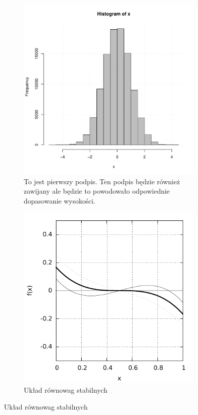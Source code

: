 \documentclass[polish, twoside, 12pt, a4paper]{article}
\theoremstyle{definition}
\theoremstyle{plain}
\theoremstyle{remark}
\begin{document}
\begin{figure}[hbt]
  \centering
  \begin{subfigure}[t]{0.45\textwidth}
    \includegraphics[width=\textwidth]{./figure-1}
    \caption{To jest pierwszy podpis. Ten podpis będzie również zawijany ale będzie to powodowało odpowiednie dopasowanie wysokości.}
    \label{fig:xxxa}
  \end{subfigure}
  \hfill
  \begin{subfigure}[t]{0.45\textwidth}
    \includegraphics[width=\textwidth]{figure-2}
    \caption{Układ równowag stabilnych}
    \label{fig:xxxb}
  \end{subfigure}
  

\end{figure}
\end{document}
